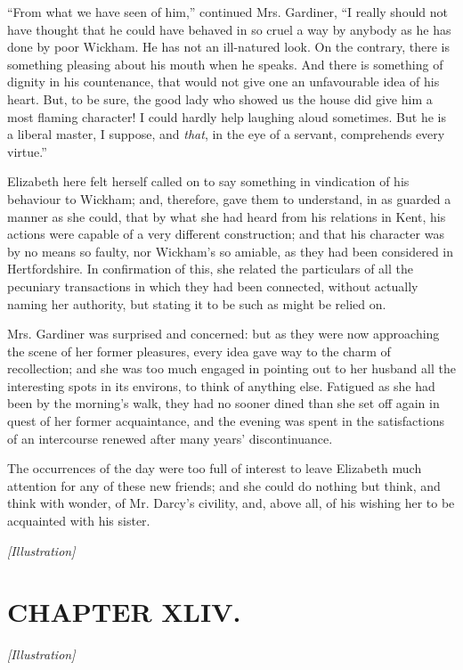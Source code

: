 \documentclass[12pt]{book}
\begin{document}
``From what we have seen of him,'' continued Mrs. Gardiner, ``I really should not have thought that he could have behaved in so cruel a way by anybody as he has done by poor Wickham. He has not an ill-natured look. On the contrary, there is something pleasing about his mouth when he speaks. And there is something of dignity in his countenance, that would not give one an unfavourable idea of his heart. But, to be sure, the good lady who showed us the house did give him a most flaming character! I could hardly help laughing aloud sometimes. But he is a liberal master, I suppose, and \textit{that}, in the eye of a servant, comprehends every virtue.''

Elizabeth here felt herself called on to say something in vindication of his behaviour to Wickham; and, therefore, gave them to understand, in as guarded a manner as she could, that by what she had heard from his relations in Kent, his actions were capable of a very different construction; and that his character was by no means so faulty, nor Wickham's so amiable, as they had been considered in Hertfordshire. In confirmation of this, she related the particulars of all the pecuniary transactions in which they had been connected, without actually naming her authority, but stating it to be such as might be relied on.

Mrs. Gardiner was surprised and concerned: but as they were now approaching the scene of her former pleasures, every idea gave way to the charm of recollection; and she was too much engaged in pointing out to her husband all the interesting spots in its environs, to think of anything else. Fatigued as she had been by the morning's walk, they had no sooner dined than she set off again in quest of her former acquaintance, and the evening was spent in the satisfactions of an intercourse renewed after many years' discontinuance.

The occurrences of the day were too full of interest to leave Elizabeth much attention for any of these new friends; and she could do nothing but think, and think with wonder, of Mr. Darcy's civility, and, above all, of his wishing her to be acquainted with his sister.

\emph{[Illustration]}

\chapter{CHAPTER XLIV.}

\emph{[Illustration]}
\end{document}
